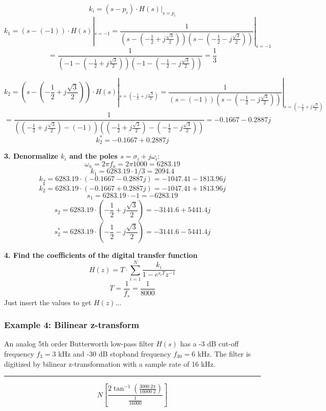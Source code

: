 $$k_{i}=(s-p_{i})\cdot H(s)\vert_{s=p_{i}}$$
$$k_{1}=(s-(-1))\cdot H(s)|_{s=-1}=\frac{1}{(s-(-\frac{1}{2}+j\frac{\sqrt{3}}{2}))(s-(-\frac{1}{2}-j\frac{\sqrt{3}}{2}))}|_{s=-1}$$
$$=\frac{1}{(-1-(-\frac{1}{2}+j\frac{\sqrt{3}}{2}))(-1-(-\frac{1}{2}-j\frac{\sqrt{3}}{2}))}=\frac{1}{3}$$

$$k_{2}=(s-(-\frac{1}{2}+j\frac{\sqrt{3}}{2}))\cdot H(s)|_{s=(-\frac{1}{2}+j\frac{\sqrt{3}}{2})}=\frac{1}{(s-(-1))(s-(-\frac{1}{2}-j\frac{\sqrt{3}}{2}))}|_{s=(-\frac{1}{2}+j\frac{\sqrt{3}}{2})}$$
$$=\frac{1}{((-\frac{1}{2}+j\frac{\sqrt{3}}{2})-(-1))((-\frac{1}{2}+j\frac{\sqrt{3}}{2})-(-\frac{1}{2}-j\frac{\sqrt{3}}{2}))}=-0.1667-0.2887j$$
$$k_2^*=-0.1667+0.2887j$$

\textbf{3. Denormalize $k_i$ and the poles $s=\sigma_i+j\omega_i$}:
$$\omega_a=2\pi f_a=2\pi 1000=6283.19$$
$$k_1=6283.19\cdot 1/3=2094.4$$
$$k_2=6283.19\cdot (-0.1667-0.2887j)=-1047.41 - 1813.96j$$
$$k_2^*=6283.19\cdot (-0.1667+0.2887j)=-1047.41 + 1813.96j$$
$$s_1=6283.19\cdot-1=-6283.19$$
$$s_2=6283.19\cdot\left(-\frac{1}{2}+j\frac{\sqrt{3}}{2}\right)=-3141.6 + 5441.4j$$
$$s_2^*=6283.19\cdot\left(-\frac{1}{2}-j\frac{\sqrt{3}}{2}\right)=-3141.6 - 5441.4j$$

\textbf{4. Find the coefficients of the digital transfer function}
$$H(z)=T\cdot \sum_{i=1}^N \frac{k_i}{1-e^{s_i T}z^{-1}}$$
$$T=\frac{1}{f_s}=\frac{1}{8000}$$
Just insert the values to get $H(z)$...
\subsubsection{Example 4: Bilinear z-transform}
An analog 5th order Butterworth low-pass filter $H(s)$ has a -3 dB cut-off frequency $f_3= 3$ kHz and -30 dB stopband frequency $f_{30}= 6$ kHz. 
The filter is digitized by bilinear z-transformation with a sample rate of 16 kHz. 

\rule{\textwidth}{0.5pt}

$$N\left[\frac{2 \tan ^{-1}\left(\frac{3000\ 2 \pi }{16000\ 2}\right)}{\frac{1}{16000}}\right]$$
